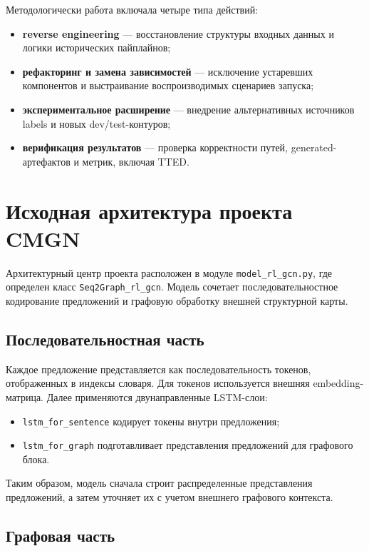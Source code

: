 \documentclass[12pt,a4paper]{article}
\begin{document}
Методологически работа включала четыре типа действий:

\begin{itemize}
    \item \textbf{reverse engineering} --- восстановление структуры входных данных и логики исторических пайплайнов;
    \item \textbf{рефакторинг и замена зависимостей} --- исключение устаревших компонентов и выстраивание воспроизводимых сценариев запуска;
    \item \textbf{экспериментальное расширение} --- внедрение альтернативных источников labels и новых dev/test-контуров;
    \item \textbf{верификация результатов} --- проверка корректности путей, generated-артефактов и метрик, включая TTED.
\end{itemize}

\section{Исходная архитектура проекта CMGN}

Архитектурный центр проекта расположен в модуле \texttt{model\_rl\_gcn.py}, где определен класс \texttt{Seq2Graph\_rl\_gcn}. Модель сочетает последовательностное кодирование предложений и графовую обработку внешней структурной карты.

\subsection{Последовательностная часть}

Каждое предложение представляется как последовательность токенов, отображенных в индексы словаря. Для токенов используется внешняя embedding-матрица. Далее применяются двунаправленные LSTM-слои:

\begin{itemize}
    \item \texttt{lstm\_for\_sentence} кодирует токены внутри предложения;
    \item \texttt{lstm\_for\_graph} подготавливает представления предложений для графового блока.
\end{itemize}

Таким образом, модель сначала строит распределенные представления предложений, а затем уточняет их с учетом внешнего графового контекста.

\subsection{Графовая часть}
\end{document}
